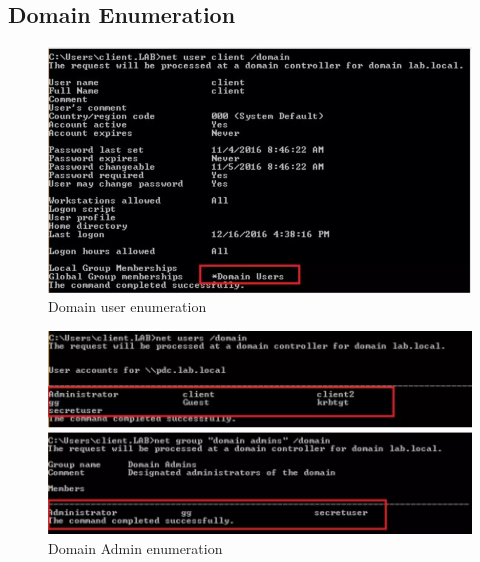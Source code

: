 \subsection{Domain Enumeration}
\begin{figure}
    \centering
    \includegraphics[width=0.75\linewidth]{domenum1.png}
    \caption{Domain user enumeration}
    \label{fig:placeholder}
\end{figure}
\begin{figure}
    \centering
    \includegraphics[width=0.75\linewidth]{domenum2.png}
    \caption{Domain Admin enumeration}
    \label{fig:placeholder}
\end{figure}
